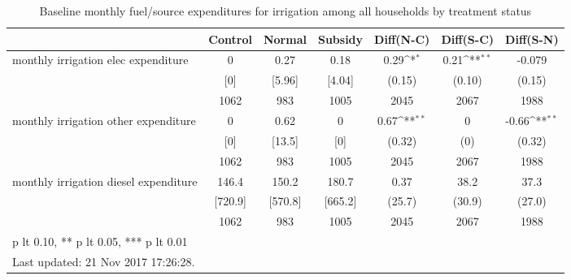 \begin{table}[htbp]\centering
\def\sym#1{\ifmmode^{#1}\else\(^{#1}\)\fi}
\caption{Baseline monthly fuel/source expenditures for irrigation among all households by treatment status \label{tab:"balance"}}
\begin{tabular*}{1\hsize}{@{\hskip\tabcolsep\extracolsep\fill}l*{1}{cccccc}}
\toprule
                                &  Control&   Normal&  Subsidy&Diff(N-C)         &Diff(S-C)         &Diff(S-N)         \\
\midrule
monthly irrigation elec expenditure&        0&     0.27&     0.18&     0.29\sym{*}  &     0.21\sym{**} &   -0.079         \\
                                &      [0]&   [5.96]&   [4.04]&   (0.15)         &   (0.10)         &   (0.15)         \\
                                &     1062&      983&     1005&     2045         &     2067         &     1988         \\
monthly irrigation other expenditure&        0&     0.62&        0&     0.67\sym{**} &        0         &    -0.66\sym{**} \\
                                &      [0]&   [13.5]&      [0]&   (0.32)         &      (0)         &   (0.32)         \\
                                &     1062&      983&     1005&     2045         &     2067         &     1988         \\
monthly irrigation diesel expenditure&    146.4&    150.2&    180.7&     0.37         &     38.2         &     37.3         \\
                                &  [720.9]&  [570.8]&  [665.2]&   (25.7)         &   (30.9)         &   (27.0)         \\
                                &     1062&      983&     1005&     2045         &     2067         &     1988         \\
\bottomrule
\multicolumn{7}{l}{\footnotesize * p lt 0.10, ** p lt 0.05, *** p lt 0.01}\\
\multicolumn{7}{l}{\footnotesize Last updated: 21 Nov 2017 17:26:28.}\\
\end{tabular*}
\end{table}

